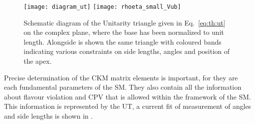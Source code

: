 \begin{figure}
  \begin{center}
      \texttt{[image: diagram\_ut]}
      \texttt{[image: rhoeta\_small\_Vub]}
  \end{center}
  \caption[Unitarity triangle]{\small
    Schematic diagram of the Unitarity triangle given in Eq.~\ref{eq:th:ut} on the complex plane,
    where the base has been normalized to unit length.
    Alongside is shown the same triangle with coloured bands indicating various constraints on
    side lengths, angles and position of the apex.
  }
  \label{fig:th:ut}
\end{figure}

Precise determination of the CKM matrix elements is important, for  they are each fundamental
parameters of the SM.
They also contain all the information about flavour violation and CPV that is allowed within the
framework of the SM.
This information is represented by the UT, a current fit of measurement of angles and side lengths
is shown in .

%








